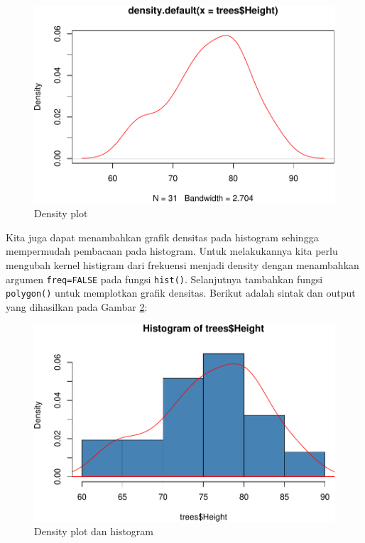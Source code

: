 \documentclass[]{book}
\newenvironment{Shaded}{\begin{snugshade}}{\end{snugshade}}
\newcommand{\KeywordTok}[1]{\textcolor[rgb]{0.13,0.29,0.53}{\textbf{#1}}}
\newcommand{\DataTypeTok}[1]{\textcolor[rgb]{0.13,0.29,0.53}{#1}}
\newcommand{\StringTok}[1]{\textcolor[rgb]{0.31,0.60,0.02}{#1}}
\newcommand{\CommentTok}[1]{\textcolor[rgb]{0.56,0.35,0.01}{\textit{#1}}}
\newcommand{\OtherTok}[1]{\textcolor[rgb]{0.56,0.35,0.01}{#1}}
\newcommand{\OperatorTok}[1]{\textcolor[rgb]{0.81,0.36,0.00}{\textbf{#1}}}
\newcommand{\NormalTok}[1]{#1}
\begin{document}
\begin{figure}

{\centering \includegraphics[width=0.7\linewidth]{EnvStat_files/figure-latex/dens-1} 

}

\caption{Density plot}\label{fig:dens}
\end{figure}

Kita juga dapat menambahkan grafik densitas pada histogram sehingga
mempermudah pembacaan pada histogram. Untuk melakukannya kita perlu
mengubah kernel histigram dari frekuensi menjadi density dengan
menambahkan argumen \texttt{freq=FALSE} pada fungsi \texttt{hist()}.
Selanjutnya tambahkan fungsi \texttt{polygon()} untuk memplotkan grafik
densitas. Berikut adalah sintak dan output yang dihasilkan pada Gambar
\ref{fig:denshist}:

\begin{Shaded}
\end{Shaded}

\begin{figure}

{\centering \includegraphics[width=0.7\linewidth]{EnvStat_files/figure-latex/denshist-1} 

}

\caption{Density plot dan histogram}\label{fig:denshist}
\end{figure}
\end{document}
